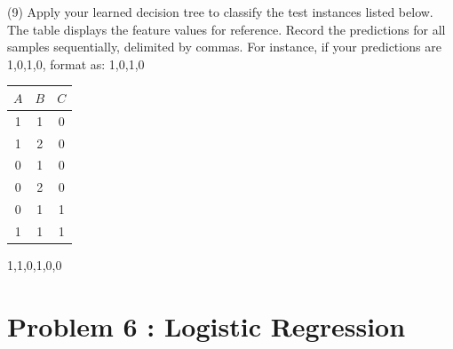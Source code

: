 \documentclass[11pt,addpoints,answers]{exam}
\begin{document}
\begin{questions}
		
		\item[(9)] Apply your learned decision tree to classify the test instances listed below. The table displays the feature values for reference. Record the predictions for all samples sequentially, delimited by commas. For instance, if your predictions are 1,0,1,0, format as: 1,0,1,0
		
		\begin{center}
			\begin{tabular}{|c|c|c|}
				\hline
				$A$ & $B$ & $C$ \\ 
				\hline
				1 & 1 & 0 \\ 
				\hline
				1 & 2 & 0 \\ 
				\hline
				0 & 1 & 0 \\ 
				\hline
				0 & 2 & 0 \\ 
				\hline
				0 & 1 & 1 \\ 
				\hline
				1 & 1 & 1 \\ 
				\hline
			\end{tabular}
		\end{center}
		
		\begin{answer_box}[title=Predicted Labels]
			1,1,0,1,0,0
		\end{answer_box}
		
	\end{questions}
	
	
	
	\section*{Problem 6 : Logistic Regression}
	\label{sec:warm-up}
	
\end{document}
